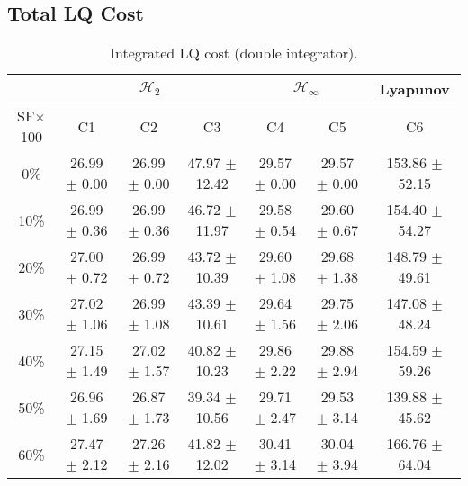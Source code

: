 \subsection{Total LQ Cost}
\begin{table}[H]
\centering
\scriptsize
\begin{tabular}{| c || c | c | c | c | c | c |}
	\hline
	 & \multicolumn{3}{c|}{$\mathcal{H}_{2}$} & \multicolumn{2}{c|}{$\mathcal{H}_{\infty}$} & Lyapunov\\
	\hline
	SF$\times$100 & C1& C2 & C3 & C4 & C5 & C6\\
	\hline\hline
	0\% & 26.99 $\pm$ 0.00 & 26.99 $\pm$ 0.00 & 47.97 $\pm$ 12.42 & 29.57 $\pm$ 0.00 & 29.57 $\pm$ 0.00 & 153.86 $\pm$ 52.15\\
	\hline
	10\% & 26.99 $\pm$ 0.36 & 26.99 $\pm$ 0.36 & 46.72 $\pm$ 11.97 & 29.58 $\pm$ 0.54 & 29.60 $\pm$ 0.67 & 154.40 $\pm$ 54.27\\
	\hline
	20\% & 27.00 $\pm$ 0.72 & 26.99 $\pm$ 0.72 & 43.72 $\pm$ 10.39 & 29.60 $\pm$ 1.08 & 29.68 $\pm$ 1.38 & 148.79 $\pm$ 49.61\\
	\hline
	30\% & 27.02 $\pm$ 1.06 & 26.99 $\pm$ 1.08 & 43.39 $\pm$ 10.61 & 29.64 $\pm$ 1.56 & 29.75 $\pm$ 2.06 & 147.08 $\pm$ 48.24\\
	\hline
	40\% & 27.15 $\pm$ 1.49 & 27.02 $\pm$ 1.57 & 40.82 $\pm$ 10.23 & 29.86 $\pm$ 2.22 & 29.88 $\pm$ 2.94 & 154.59 $\pm$ 59.26\\
	\hline
	50\% & 26.96 $\pm$ 1.69 & 26.87 $\pm$ 1.73 & 39.34 $\pm$ 10.56 & 29.71 $\pm$ 2.47 & 29.53 $\pm$ 3.14 & 139.88 $\pm$ 45.62\\
	\hline
	60\% & 27.47 $\pm$ 2.12 & 27.26 $\pm$ 2.16 & 41.82 $\pm$ 12.02 & 30.41 $\pm$ 3.14 & 30.04 $\pm$ 3.94 & 166.76 $\pm$ 64.04\\
	\hline
\end{tabular}
\caption{Integrated LQ cost (double integrator).}
\label{table:lq_cost_double_integrator:unc}
\end{table}

